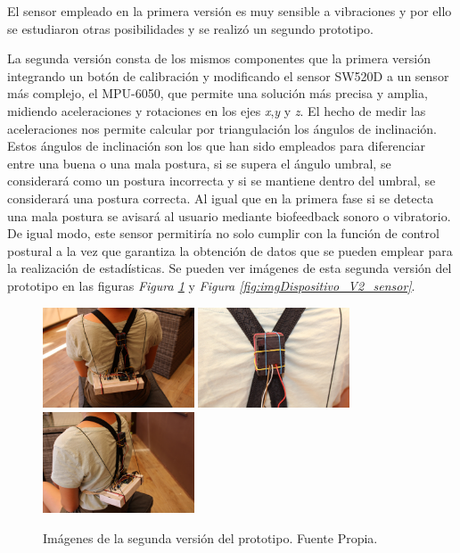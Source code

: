 El sensor empleado en la primera versión es muy sensible a vibraciones y por ello se estudiaron otras posibilidades y se realizó un segundo prototipo.

La segunda versión consta de los mismos componentes que la primera versión integrando un botón de calibración y modificando el sensor SW520D\cite{SW520D_1} a un sensor más complejo, el MPU-6050\cite{MPU6050_1,MPU6050_2}, que permite una solución más precisa y amplia, midiendo aceleraciones y rotaciones en los ejes \textit{x},\textit{y} y \textit{z}. El hecho de medir las aceleraciones nos permite calcular por triangulación los ángulos de inclinación. Estos ángulos de inclinación son los que han sido empleados para diferenciar entre una buena o una mala postura, si se supera el ángulo umbral, se considerará como un postura incorrecta y si se mantiene dentro del umbral, se considerará una postura correcta. Al igual que en la primera fase si se detecta una mala postura se avisará al usuario mediante biofeedback sonoro o vibratorio. De igual modo, este sensor permitiría no solo cumplir con la función de control postural a la vez que garantiza la obtención de datos que se pueden emplear para la realización de estadísticas. Se pueden ver imágenes de esta segunda versión del prototipo en las figuras \textit{Figura \ref{fig:imgDispositivo_V2}} y \textit{Figura \ref{fig:imgDispositivo_V2_sensor}}.

\begin{figure}[h!]
    \centering
    \includegraphics[width=0.4\textwidth]{img/Disp_V2_1.jpg}
    \includegraphics[width=0.4\textwidth]{img/Disp_V2_2.jpg}
    \includegraphics[width=0.4\textwidth]{img/Disp_V2_3.jpg}
    \caption{Imágenes de la segunda versión del prototipo. Fuente Propia.}
    \label{fig:imgDispositivo_V2} 
\end{figure}

